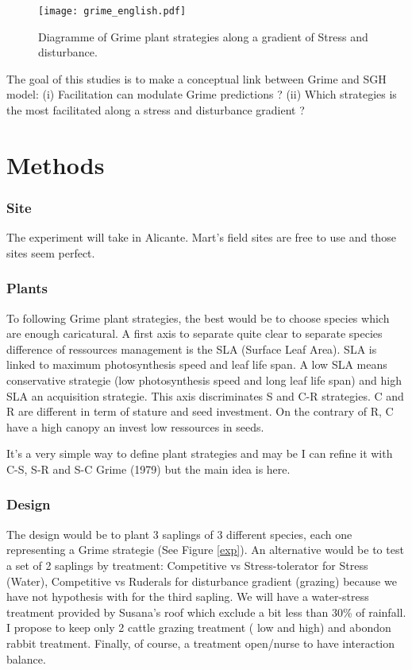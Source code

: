\documentclass[12pt]{article} %
\begin{document}
\begin{figure}
\begin{center}
\texttt{[image: grime\_english.pdf]}
\end{center}
\caption{Diagramme of Grime plant strategies along a gradient of Stress and disturbance.\label{Grime}}
\end{figure}



The goal of this studies is to make a conceptual link between Grime and SGH model: (i) Facilitation can modulate Grime predictions ? (ii) Which strategies is the most facilitated along a stress and disturbance gradient ?

\part{Methods}

\section{Site}

The experiment will take in Alicante. Mart's field sites are free to use and those sites seem perfect.

\section{Plants}

To following Grime plant strategies, the best would be to choose species which are enough caricatural. A first axis to separate  quite clear to separate species  difference of ressources management is the SLA (Surface Leaf Area). SLA is linked to maximum photosynthesis speed and leaf life span. A low SLA means conservative strategie (low photosynthesis speed and long leaf life span) and high SLA an acquisition strategie. This axis discriminates S and C-R strategies. C and R are different in term of stature and seed investment. On the contrary of R, C have a high canopy an invest low ressources in seeds.

It's a very simple way to define plant strategies and may be I can refine it with C-S, S-R and S-C Grime (1979) but the main idea is here. 


\section{Design}

The design would be to plant 3 saplings of 3 different species, each one representing a Grime strategie (See Figure \ref{exp}). An alternative would be to test a set of 2 saplings by treatment: Competitive vs Stress-tolerator for Stress (Water), Competitive vs Ruderals for disturbance gradient (grazing) because we have not hypothesis with for the third sapling. We will have a water-stress treatment provided by Susana's roof which exclude a bit less than 30\% of rainfall. I propose to keep only 2 cattle grazing treatment ( low and high) and abondon rabbit treatment. Finally, of course, a treatment open/nurse to have interaction balance.
\end{document}
